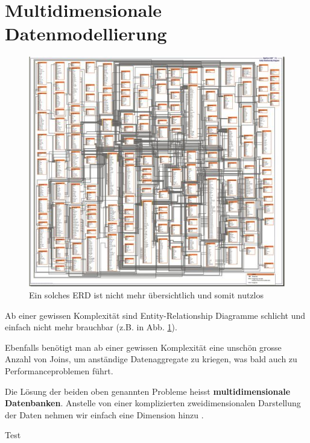 \documentclass[a4paper, 11pt, nofootinbib]{article}
\begin{document}
\newpage

\section{Multidimensionale Datenmodellierung}
\begin{figure}
	\centering
	\includegraphics[keepaspectratio=true,height=18\baselineskip]{erd.JPG}
	\caption{Ein solches ERD ist nicht mehr übersichtlich und somit nutzlos}
	\label{fig:erd}
\end{figure}
Ab einer gewissen Komplexität sind Entity-Relationship Diagramme schlicht und einfach nicht mehr brauchbar (z.B. in Abb. \ref{fig:erd}).

\vspace{10px}

\noindent Ebenfalls benötigt man ab einer gewissen Komplexität eine unschön grosse Anzahl von Joins, um anständige Datenaggregate zu kriegen, was bald auch zu Performanceproblemen führt. 

\vspace{10px}

\noindent Die Lösung der beiden oben genannten Probleme heisst \textbf{multidimensionale Datenbanken}. Anstelle von einer komplizierten zweidimensionalen Darstellung der Daten nehmen wir einfach eine Dimension hinzu .

\vspace{40px}

\noindent Test
\end{document}
